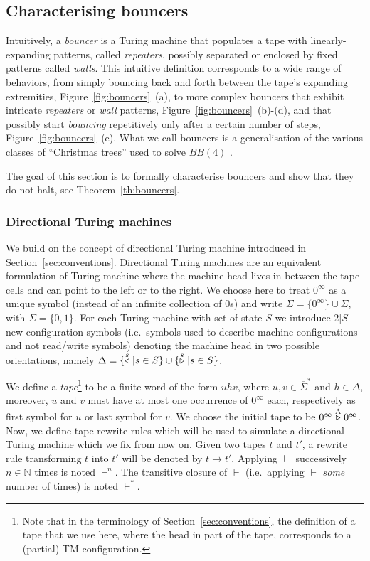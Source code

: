 \subsection{Characterising bouncers}

Intuitively, a \emph{bouncer} is a Turing machine that populates a tape with
linearly-expanding patterns, called \textit{repeaters}, possibly separated or enclosed by fixed patterns called \textit{walls}. This intuitive definition corresponds to a wide range of behaviors, from simply bouncing back and forth between the tape's expanding extremities, Figure~\ref{fig:bouncers}~(a), to more complex bouncers that exhibit intricate \textit{repeaters} or \textit{wall} patterns, Figure~\ref{fig:bouncers}~(b)-(d), and that possibly start \textit{bouncing} repetitively only after a certain number of steps, Figure~\ref{fig:bouncers}~(e). What we call bouncers is a generalisation of the various classes of ``Christmas trees'' used to solve $BB(4)$ \cite{Brady83}.

The goal of this section is to formally characterise bouncers and show that they do not halt, see Theorem~\ref{th:bouncers}.

\subsubsection{Directional Turing machines}\label{sec:bouncers:directionalTM}

We build on the concept of directional Turing machine introduced in Section~\ref{sec:conventions}. Directional Turing machines are an equivalent formulation of Turing machine where the machine head lives in between the tape cells and can point to the left or to the right. We choose here to treat $0^\infty$ as a unique symbol (instead of an infinite collection of 0s) and write $\overline{\Sigma} = \{0^\infty\}\cup\Sigma$, with $\Sigma=\{0,1\}$. For each Turing machine with set of state $S$ we introduce 2$|S|$ new configuration symbols (i.e.\ symbols used to describe machine configurations and not read/write symbols) denoting the machine head in two possible orientations, namely $\Delta = \{\stackrel{s}\triangleleft | s\in S\}\cup\{\stackrel{s}\triangleright| s \in S\}$.

We define a \textit{tape}\footnote{Note that in the terminology of Section~\ref{sec:conventions}, the definition of a tape that we use here, where the head in part of the tape, corresponds to a (partial) TM configuration.} to be a finite word of the form $uhv$, where $u,v\in \overline{\Sigma}^*$ and $h\in\Delta$, moreover, $u$ and $v$ must have at most one occurrence of $0^\infty$ each, respectively as first symbol for $u$ or last symbol for $v$. We choose the initial tape to be $0^\infty \stackrel{\text{A}}\triangleright 0^\infty$. Now, we define tape rewrite rules which will be used to simulate a directional Turing machine which we fix from now on. Given two tapes $t$ and $t'$, a rewrite rule transforming $t$ into $t'$ will be denoted by $t\to t'$. Applying $\vdash$ successively $n\in\mathbb{N}$ times is noted $\vdash^n$. The transitive closure of $\vdash$ (i.e.\ applying $\vdash$ \textit{some} number of times) is noted $\vdash^*$.

